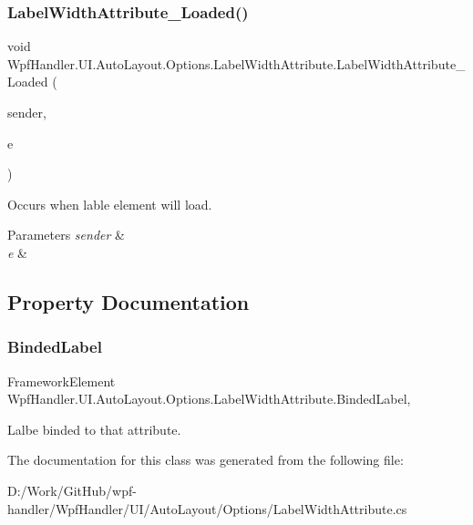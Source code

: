 \subsubsection{\texorpdfstring{Label\+Width\+Attribute\+\_\+\+Loaded()}{LabelWidthAttribute\_Loaded()}}
{\footnotesize\ttfamily void Wpf\+Handler.\+U\+I.\+Auto\+Layout.\+Options.\+Label\+Width\+Attribute.\+Label\+Width\+Attribute\+\_\+\+Loaded (\begin{DoxyParamCaption}\item[{object}]{sender,  }\item[{Routed\+Event\+Args}]{e }\end{DoxyParamCaption})\hspace{0.3cm}{\ttfamily [private]}}



Occurs when lable element will load. 


\begin{DoxyParams}{Parameters}
{\em sender} & \\
\hline
{\em e} & \\
\hline
\end{DoxyParams}


\subsection{Property Documentation}
\mbox{\label{class_wpf_handler_1_1_u_i_1_1_auto_layout_1_1_options_1_1_label_width_attribute_ae3a052219f7ebdf78dc6e47962a9f8b9}} 
\subsubsection{\texorpdfstring{Binded\+Label}{BindedLabel}}
{\footnotesize\ttfamily Framework\+Element Wpf\+Handler.\+U\+I.\+Auto\+Layout.\+Options.\+Label\+Width\+Attribute.\+Binded\+Label\hspace{0.3cm}{\ttfamily [get]}, {}}



Lalbe binded to that attribute. 



The documentation for this class was generated from the following file\+:\begin{DoxyCompactItemize}
\item 
D\+:/\+Work/\+Git\+Hub/wpf-\/handler/\+Wpf\+Handler/\+U\+I/\+Auto\+Layout/\+Options/Label\+Width\+Attribute.\+cs\end{DoxyCompactItemize}
